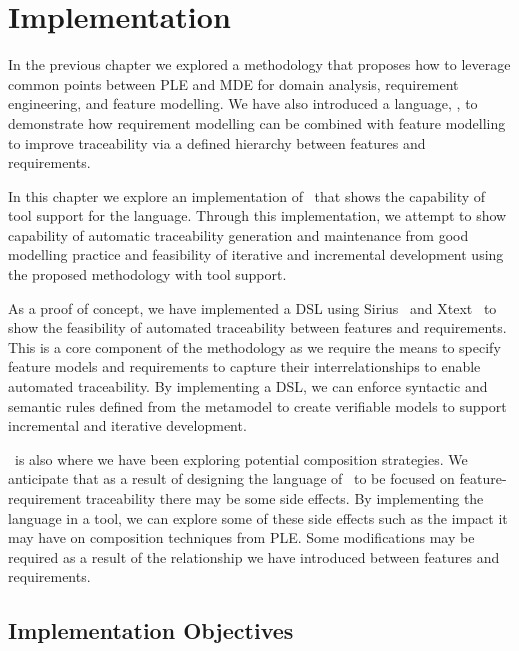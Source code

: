 \chapter{Implementation}

In the previous chapter we explored a methodology that proposes how to leverage common points between \acf{PLE} and \acf{MDE} for domain analysis, requirement engineering, and feature modelling. We have also introduced a language, \tool, to demonstrate how requirement modelling can be combined with feature modelling to improve traceability via a defined hierarchy between features and requirements.

In this chapter we explore an implementation of \tool\ that shows the capability of tool support for the language. Through this implementation, we attempt to show capability of automatic traceability generation and maintenance from good modelling practice and feasibility of iterative and incremental development using the proposed methodology with tool support.

As a proof of concept, we have implemented a \ac{DSL} using Sirius~\cite{viyovic2014sirius} and Xtext~\cite{eysholdt2010xtext} to show the feasibility of automated traceability between features and requirements. This is a core component of the methodology as we require the means to specify feature models and requirements to capture their interrelationships to enable automated traceability. By implementing a \ac{DSL}, we can enforce syntactic and semantic rules defined from the metamodel to create verifiable models to support incremental and iterative development.

\tool\ is also where we have been exploring potential composition strategies. We anticipate that as a result of designing the language of \tool\ to be focused on feature-requirement traceability there may be some side effects. By implementing the language in a tool, we can explore some of these side effects such as the impact it may have on composition techniques from \ac{PLE}. Some modifications may be required as a result of the relationship we have introduced between features and requirements. 


\section{Implementation Objectives}

